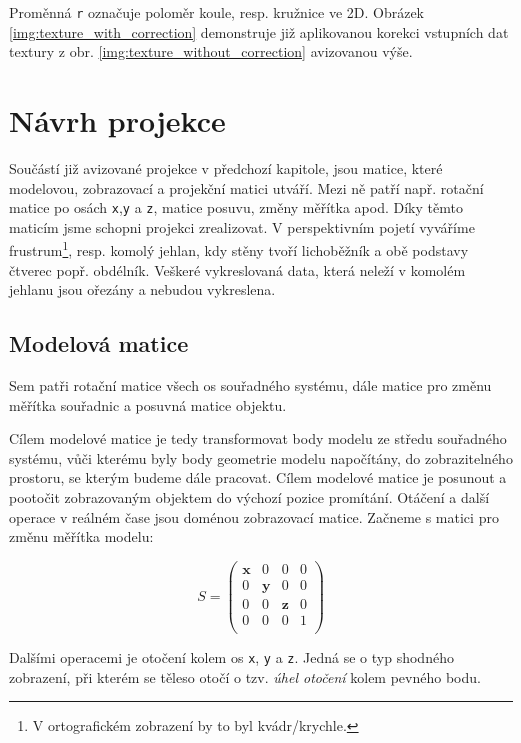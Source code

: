 Proměnná \texttt{r} označuje poloměr koule, resp. kružnice ve 2D. Obrázek \ref{img:texture_with_correction} demonstruje již aplikovanou  korekci vstupních dat  textury z obr. \ref{img:texture_without_correction} avizovanou výše.
 

\newpage


\section{Návrh projekce}
Součástí již avizované projekce v předchozí kapitole, jsou matice, které modelovou, zobrazovací a projekční matici utváří. Mezi ně patří např. rotační matice po osách \texttt{x},\texttt{y} a \texttt{z}, matice posuvu, změny měřítka apod. Díky těmto maticím jsme schopni projekci zrealizovat. V perspektivním pojetí vyváříme frustrum\footnote{V ortografickém zobrazení by to byl kvádr/krychle.}, resp. komolý jehlan, kdy stěny tvoří lichoběžník a obě podstavy čtverec popř. obdélník. Veškeré vykreslovaná data, která neleží v komolém jehlanu jsou ořezány  a nebudou vykreslena. 




\subsection{Modelová matice}
Sem patři rotační matice všech os souřadného systému, dále matice pro změnu měřítka souřadnic a posuvná matice objektu.

Cílem modelové matice je tedy transformovat body modelu ze středu souřadného systému, vůči kterému byly body geometrie modelu napočítány, do zobrazitelného prostoru, se kterým budeme dále pracovat. Cílem modelové matice je posunout a pootočit zobrazovaným objektem do výchozí pozice promítání. Otáčení a další operace v reálném čase jsou  doménou zobrazovací matice. Začneme s matici pro změnu měřítka modelu:

$$
S =
\begin{pmatrix} 
\textbf{x} & 0 & 0 & 0\\
0 & \textbf{y} & 0 & 0\\ 
0 & 0 & \textbf{z} & 0\\ 
0 & 0 & 0 & 1\\ 
\end{pmatrix}$$

Dalšími operacemi je otočení kolem os \texttt{x}, \texttt{y} a \texttt{z}. Jedná se o typ shodného zobrazení, při kterém se těleso otočí o tzv. \textit{úhel otočení} kolem pevného bodu. \cite{Kompendium}
\newline


